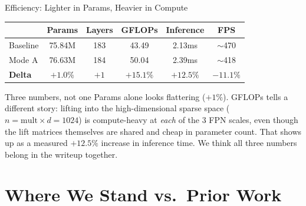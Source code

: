 \documentclass[aspectratio=169]{beamer}
\begin{document}
\begin{frame}{Efficiency: Lighter in Params, Heavier in Compute}
  \begin{table}
    \centering\small
    \begin{tabular}{lccccc}
      \toprule
      & Params & Layers & GFLOPs & Inference & FPS \\
      \midrule
      Baseline & 75.84M & 183 & 43.49 & 2.13ms & $\sim$470 \\
      Mode A   & 76.63M & 184 & 50.04 & 2.39ms & $\sim$418 \\
      \midrule
      \textbf{Delta} & $+1.0\%$ & $+1$ & $\mathbf{+15.1\%}$ & $\mathbf{+12.5\%}$ & $-11.1\%$ \\
      \bottomrule
    \end{tabular}
  \end{table}
  \vspace{0.2cm}
  \begin{block}{Three numbers, not one}
    \footnotesize Params alone looks flattering ($+1\%$). GFLOPs tells
    a different story: lifting into the high-dimensional sparse space
    ($n{=}\text{mult}\times d = 1024$) is compute-heavy at \emph{each}
    of the 3 FPN scales, even though the lift matrices themselves are
    shared and cheap in parameter count. That shows up as a measured
    $+12.5\%$ increase in inference time. We think all three numbers
    belong in the writeup together.
  \end{block}
\end{frame}

\section{Where We Stand vs.\ Prior Work}
\end{document}
